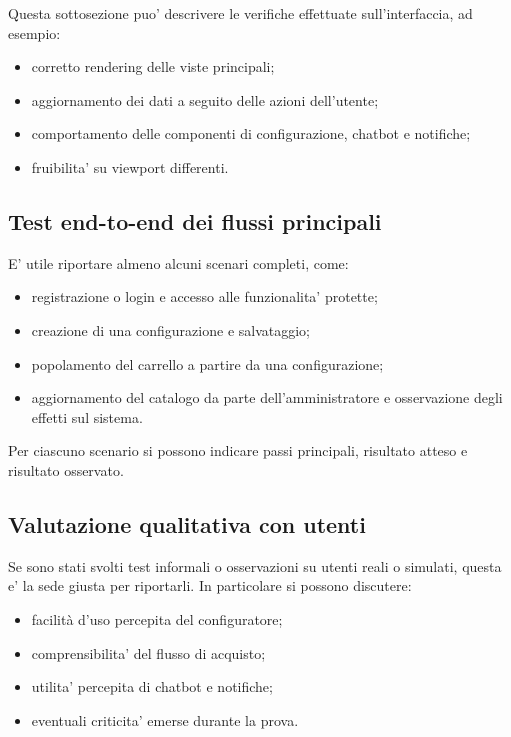 Questa sottosezione puo' descrivere le verifiche effettuate sull'interfaccia, ad esempio:

\begin{itemize}
	\item corretto rendering delle viste principali;
	\item aggiornamento dei dati a seguito delle azioni dell'utente;
	\item comportamento delle componenti di configurazione, chatbot e notifiche;
	\item fruibilita' su viewport differenti.
\end{itemize}

\subsection{Test end-to-end dei flussi principali}

E' utile riportare almeno alcuni scenari completi, come:

\begin{itemize}
	\item registrazione o login e accesso alle funzionalita' protette;
	\item creazione di una configurazione e salvataggio;
	\item popolamento del carrello a partire da una configurazione;
	\item aggiornamento del catalogo da parte dell'amministratore e osservazione degli effetti sul sistema.
\end{itemize}

Per ciascuno scenario si possono indicare passi principali, risultato atteso e risultato osservato.

\subsection{Valutazione qualitativa con utenti}

Se sono stati svolti test informali o osservazioni su utenti reali o simulati, questa e' la sede giusta per riportarli. In particolare si possono discutere:

\begin{itemize}
	\item facilità d'uso percepita del configuratore;
	\item comprensibilita' del flusso di acquisto;
	\item utilita' percepita di chatbot e notifiche;
	\item eventuali criticita' emerse durante la prova.
\end{itemize}

